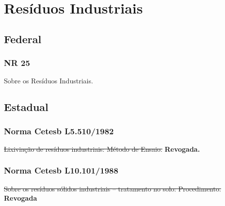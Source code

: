 \section{Resíduos Industriais}
\begin{subapend}
	\subsection{Federal}
	\begin{subsubapend}
		\item \subsubsection{NR 25}
		Sobre os Resíduos Industriais.
	\end{subsubapend}
\end{subapend}

\begin{subapend}
	\subsection{Estadual}
	\begin{subsubapend}
		\item \subsubsection{Norma Cetesb L5.510/1982}
		\sout{Lixiviação de resíduos industriais: Método de Ensaio.} \textbf{Revogada.} 
		\subsubsection{Norma Cetesb L10.101/1988}
		\sout{Sobre os resíduos sólidos industriais – tratamento no solo: Procedimento.}  \textbf{Revogada}
	\end{subsubapend}
\end{subapend}


